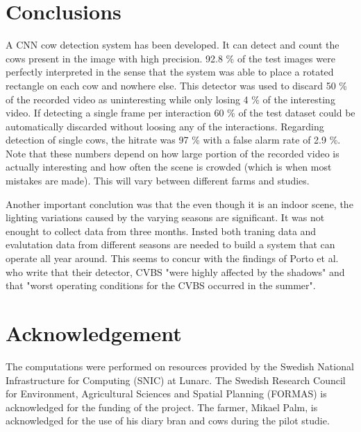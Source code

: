 \documentclass{cta-author}
\begin{document}
\section{Conclusions}
A CNN cow detection system has been developed. It can detect and count the cows present in the image with high precision. 92.8 \% of the test images were perfectly interpreted in the sense that the system was able to place a rotated rectangle on each cow and nowhere else. This detector was used to discard 50 \% of the recorded video as uninteresting while only losing 4 \% of the interesting video. If detecting a single frame per interaction 60 \% of the test dataset could be automatically discarded without loosing any of the interactions. Regarding detection of single cows, the hitrate was 97 \% with a false alarm rate of 2.9 \%. Note that these numbers depend on how large portion of the recorded video is actually interesting and how often the scene is crowded (which is when most mistakes are made). This will vary between different farms and studies.

Another important conclution was that the even though it is an indoor scene, the lighting variations caused by the varying seasons are significant. It was not enought to collect data from three months. Insted both traning data and evalutation data from different seasons are needed to build a system that can operate all year around. This seems to concur with the findings of Porto et al. \cite{porto2015automatic} who write that their detector, CVBS 
"were highly affected by the shadows" and that "worst operating
conditions for the CVBS occurred in the summer".


\section{Acknowledgement}
The computations were performed on resources provided by the Swedish National Infrastructure for Computing (SNIC) at Lunarc. The Swedish Research Council for Environment, Agricultural Sciences and 
Spatial Planning (FORMAS) is acknowledged 
for the funding of the project. The farmer, Mikael Palm, is acknowledged for the use of his diary bran and cows during the pilot studie.




{\parindent0pt
\parskip8pt

}
\end{document}
